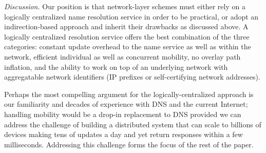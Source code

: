 {{\em Discussion.} Our position is that network-layer schemes must either rely on a logically centralized name resolution service in order to be practical, or adopt an indirection-based approach and inherit their drawbacks as discussed above. A logically centralized resolution service offers the best combination of the three categories: constant update overhead to the name service as well as within the network, efficient individual as well as concurrent mobility, no overlay path inflation, and the ability to work on top of an underlying network with aggregatable network identifiers (IP prefixes or self-certifying network addresses\cite{AIP}).

Perhaps the most compelling argument for the logically-centralized approach is our familiarity and decades of experience with DNS and the current Internet; handling mobility would be a drop-in replacement to DNS provided we can address the challenge of building a distributed system that can scale to billions of devices making tens of updates a day and yet return responses within a few milliseconds. Addressing this challenge forms the focus of the rest of the paper.

}



%
%
%




















